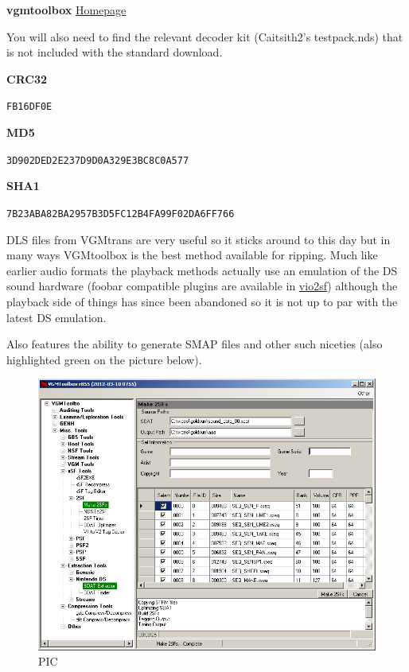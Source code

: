 \documentclass[
]{book}
\begin{document}
\textbf{vgmtoolbox} \href{http://sourceforge.net/projects/vgmtoolbox/files/vgmtoolbox/}{Homepage}

You will also need to find the relevant decoder kit (Caitsith2's testpack.nds) that is not included with the standard download.

\textbf{CRC32}

\texttt{FB16DF0E}

\textbf{MD5}

\texttt{3D902DED2E237D9D0A329E3BC8C0A577}

\textbf{SHA1}

\texttt{7B23ABA82BA2957B3D5FC12B4FA99F02DA6FF766}

DLS files from VGMtrans are very useful so it sticks around to this day but in many ways VGMtoolbox is the best method available for ripping. Much like earlier audio formats the playback methods actually use an emulation of the DS sound hardware (foobar compatible plugins are available in \href{http://filetrip.net/nds-downloads/utilities/download-vio2sf-2011-05-27-foobar-f29356.html}{vio2sf}) although the playback side of things has since been abandoned so it is not up to par with the latest DS emulation.

Also features the ability to generate SMAP files and other such niceties (also highlighted green on the picture below).

\begin{figure}
\centering
\includegraphics{images/137_home_fast6191_romhackingguide_unrenamed_files_and_original_borders_romhackguidevgmtoolbox1.png}
\caption{PIC}
\end{figure}
\end{document}
